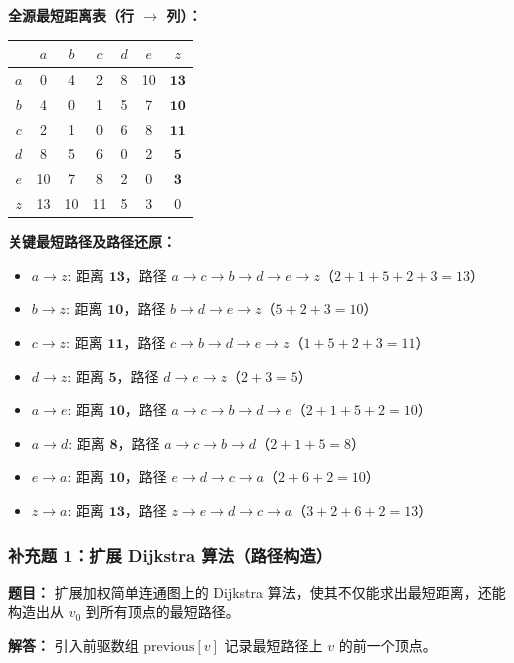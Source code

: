 \documentclass[11pt,UTF8]{article}
\begin{document}
\textbf{全源最短距离表（行 $\to$ 列）：}

\begin{center}
\begin{tabular}{c|cccccc}
 & $a$ & $b$ & $c$ & $d$ & $e$ & $z$ \\
\hline
$a$ & 0 & 4 & 2 & 8 & 10 & $\mathbf{13}$ \\
$b$ & 4 & 0 & 1 & 5 & 7 & $\mathbf{10}$ \\
$c$ & 2 & 1 & 0 & 6 & 8 & $\mathbf{11}$ \\
$d$ & 8 & 5 & 6 & 0 & 2 & $\mathbf{5}$ \\
$e$ & 10 & 7 & 8 & 2 & 0 & $\mathbf{3}$ \\
$z$ & 13 & 10 & 11 & 5 & 3 & 0
\end{tabular}
\end{center}

\textbf{关键最短路径及路径还原：}
\begin{itemize}
    \item $a \to z$: 距离 $\mathbf{13}$，路径 $a \to c \to b \to d \to e \to z$（$2+1+5+2+3=13$）
    \item $b \to z$: 距离 $\mathbf{10}$，路径 $b \to d \to e \to z$（$5+2+3=10$）
    \item $c \to z$: 距离 $\mathbf{11}$，路径 $c \to b \to d \to e \to z$（$1+5+2+3=11$）
    \item $d \to z$: 距离 $\mathbf{5}$，路径 $d \to e \to z$（$2+3=5$）
    \item $a \to e$: 距离 $\mathbf{10}$，路径 $a \to c \to b \to d \to e$（$2+1+5+2=10$）
    \item $a \to d$: 距离 $\mathbf{8}$，路径 $a \to c \to b \to d$（$2+1+5=8$）
    \item $e \to a$: 距离 $\mathbf{10}$，路径 $e \to d \to c \to a$（$2+6+2=10$）
    \item $z \to a$: 距离 $\mathbf{13}$，路径 $z \to e \to d \to c \to a$（$3+2+6+2=13$）
\end{itemize}

\subsubsection*{补充题 1：扩展 Dijkstra 算法（路径构造）}
\textbf{题目：} 扩展加权简单连通图上的 Dijkstra 算法，使其不仅能求出最短距离，还能构造出从 $v_0$ 到所有顶点的最短路径。

\textbf{解答：} 引入前驱数组 $\text{previous}[v]$ 记录最短路径上 $v$ 的前一个顶点。
\end{document}
